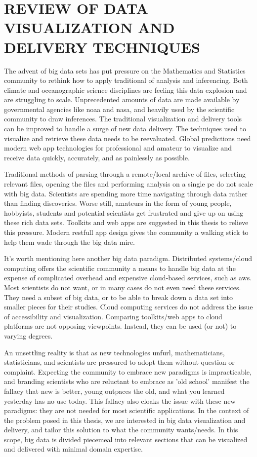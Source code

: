 \chapter{REVIEW OF DATA VISUALIZATION AND DELIVERY TECHNIQUES}
\label{chap:intro}

The advent of big data sets has put pressure on the Mathematics and Statistics community to rethink how to apply traditional of analysis and inferencing. Both climate and oceanographic science disciplines are feeling this data explosion and are struggling to scale. Unprecedented amounts of data are made available by governmental agencies like \gls{noaa} and \gls{nasa}, and heavily used by the scientific community to draw inferences. The traditional visualization and delivery tools can be improved to handle a surge of new data delivery. The techniques used to visualize and retrieve these data needs to be reevaluated. Global predictions need modern web app technologies for professional and amateur to visualize and receive data quickly, accurately, and as painlessly as possible.

Traditional methods of parsing through a remote/local archive of files, selecting relevant files, opening the files and performing analysis on a single pc do not scale with big data. Scientists are spending more time navigating through data rather than finding discoveries. Worse still, amateurs in the form of young people, hobbyists, students and potential scientists get frustrated and give up on using these rich data sets. Toolkits and web apps are suggested in this thesis to relieve this pressure. Modern \gls{restfull} app design gives the community a walking stick to help them wade through the big data mire.

It's worth mentioning here another big data paradigm. Distributed systems/cloud computing offers the scientific community a means to handle big data at the expense of complicated overhead and expensive cloud-based services, such as \gls{aws}. Most scientists do not want, or in many cases do not even need these services. They need a subset of big data, or to be able to break down a data set into smaller pieces for their studies. Cloud computing services do not address the issue of accessibility and visualization. Comparing toolkits/web apps to cloud platforms are not opposing viewpoints. Instead, they can be used (or not) to varying degrees.

An unsettling reality is that as new technologies unfurl, mathematicians, statisticians, and scientists are pressured to adopt them without question or complaint. Expecting the community to embrace new paradigms is impracticable, and branding scientists who are reluctant to embrace as 'old school' manifest the fallacy that new is better, young outpaces the old, and what you learned yesterday has no use today. This fallacy also cloaks the issue with these new paradigms: they are not needed for most scientific applications. In the context of the problem posed in this thesis, we are interested in big data visualization and delivery, and tailor this solution to what the community wants/needs. In this scope, big data is divided piecemeal into relevant sections that can be visualized and delivered with minimal domain expertise.

